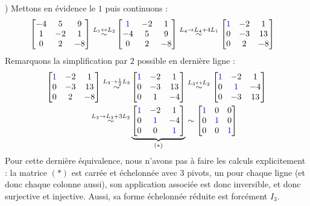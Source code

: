 \documentclass{article}
\begin{document}
) Mettons en évidence le $1$ puis continuons :
\begin{align*}
    \begin{bmatrix}
    -4 & 5 & 9\\
    1 & -2 & 1\\
    0 & 2 & -8 
    \end{bmatrix}
    \overset{L_1 \leftrightarrow L_2}{\sim}
    &\begin{bmatrix}
    \color{blue}1 & -2 & 1\\
    -4 & 5 & 9\\
    0 & 2 & -8 
    \end{bmatrix}
    \overset{L_4 \to L_4 + 4L_1}{\sim}
    \begin{bmatrix}
    \color{blue}1 & -2 & 1\\
    0 & -3 & 13\\
    0 & 2 & -8 
    \end{bmatrix}
\end{align*}
Remarquons la simplification par $2$ possible en dernière ligne :
\begin{align*}
    \begin{bmatrix}
    \color{blue}1 & -2 & 1\\
    0 & -3 & 13\\
    0 & 2 & -8 
    \end{bmatrix}
    \overset{L_3 \to \frac{1}{2}L_3}{\sim}
    &\begin{bmatrix}
    \color{blue}1 & -2 & 1\\
    0 & -3 & 13\\
    0 & 1 & -4 
    \end{bmatrix}
    \overset{L_3 \leftrightarrow L_2}{\sim}
    \begin{bmatrix}
    \color{blue}1 & -2 & 1\\
    0 & \color{blue}1 & -4 \\
    0 & -3 & 13
    \end{bmatrix}\\
    \overset{L_3 \to L_3 + 3L_2}{\sim}
    &\underbrace{\begin{bmatrix}
    \color{blue}1 & -2 & 1\\
    0 & \color{blue}1 & -4 \\
    0 & 0 & \color{blue}1
    \end{bmatrix}}_{(*)}
    \sim
    \begin{bmatrix}
    \color{blue}1 & 0 & 0\\
    0 & \color{blue}1 & 0 \\
    0 & 0 & \color{blue}1
    \end{bmatrix}
\end{align*}
Pour cette dernière équivalence, nous n'avons pas à faire les calculs explicitement : la matrice $(*)$ est carrée et échelonnée avec 3 pivots, un pour chaque ligne (et donc chaque colonne aussi), son application associée est donc inversible, et donc surjective et injective. Aussi, sa forme échelonnée réduite est forcément $I_3$.
\end{document}

